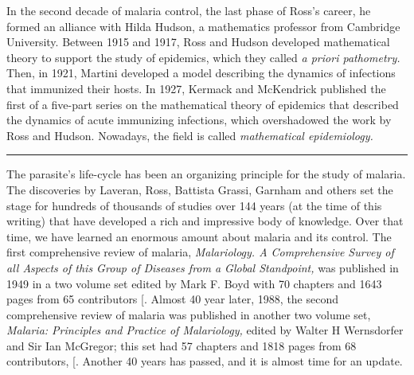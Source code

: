 \documentclass[
]{book}
\begin{document}
In the second decade of malaria control, the last phase of Ross's career, he formed an alliance with Hilda Hudson, a mathematics professor from Cambridge University. Between 1915 and 1917, Ross and Hudson developed mathematical theory to support the study of epidemics, which they called \emph{a priori pathometry.} Then, in 1921, Martini developed a model describing the dynamics of infections that immunized their hosts. In 1927, Kermack and McKendrick published the first of a five-part series on the mathematical theory of epidemics that described the dynamics of acute immunizing infections, which overshadowed the work by Ross and Hudson. Nowadays, the field is called \emph{mathematical epidemiology.}

\begin{center}\rule{0.5\linewidth}{0.5pt}\end{center}

The parasite's life-cycle has been an organizing principle for the study of malaria.
The discoveries by Laveran, Ross, Battista Grassi, Garnham and others set the stage for hundreds of thousands of studies over 144 years (at the time of this writing) that have developed a rich and impressive body of knowledge.
Over that time, we have learned an enormous amount about malaria and its control.
The first comprehensive review of malaria, \emph{Malariology. A Comprehensive Survey of all Aspects of this Group of Diseases from a Global Standpoint,} was published in 1949 in a two volume set edited by Mark F. Boyd with
70 chapters and 1643 pages from 65 contributors {[}\citeproc{ref-BoydMF1949MalariologyComprehensive}{29}{]}.
Almost 40 year later, 1988, the second comprehensive review of malaria was published in another two volume set, \emph{Malaria: Principles and Practice of Malariology,}
edited by Walter H Wernsdorfer and Sir Ian McGregor; this set had 57 chapters and 1818 pages from 68 contributors, {[}\citeproc{ref-WernsdorferWH1988MalariaPrinciples}{30}{]}.
Another 40 years has passed, and it is almost time for an update.
\end{document}
